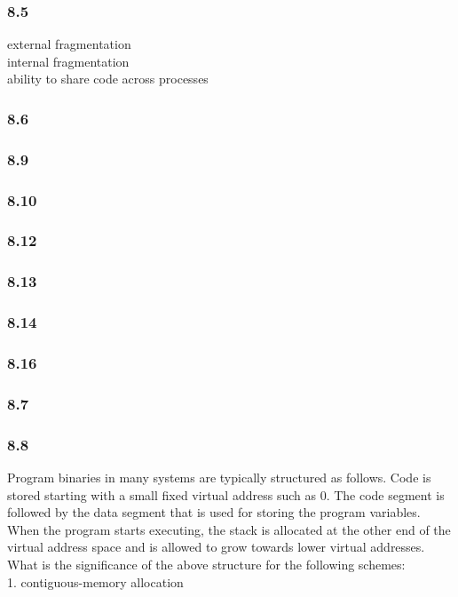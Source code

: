 \documentclass[a4paper,10pt,titlepage]{report}
\begin{document}
\subsubsection{8.5}
external fragmentation\\
internal fragmentation\\
ability to share code across processes\\


\subsubsection{8.6}

\subsubsection{8.9}
\subsubsection{8.10}
\subsubsection{8.12}
\subsubsection{8.13}
\subsubsection{8.14}
\subsubsection{8.16}
\subsubsection{8.7}
\subsubsection{8.8}
Program binaries in many systems are typically structured as follows. Code is stored starting with a small fixed virtual address such as 0. The code segment is followed by the data segment that is used for storing the program variables. When the program starts executing, the stack is allocated at the other end of the virtual address space and is allowed to grow towards lower virtual addresses. What is the significance of the above structure for the following schemes:\\
\hspace{10mm} 1. contiguous-memory allocation \\
\end{document}
